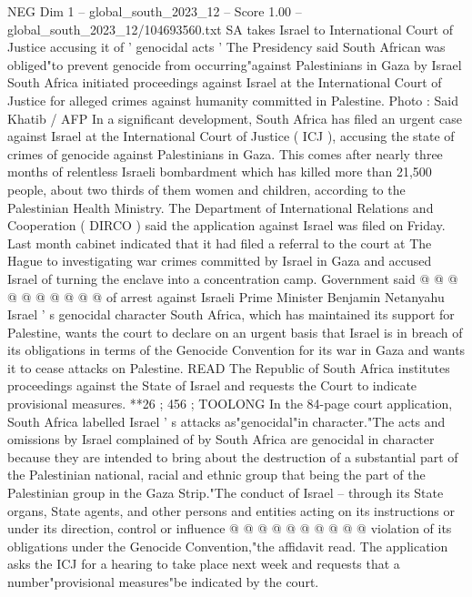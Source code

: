 \begin{textsample}{NEG Dim 1 – global\_south\_2023\_12 – Score 1.00 – global\_south\_2023\_12/104693560.txt}  \label{ex:f1_neg_289}
SA takes Israel to International Court of Justice accusing it of ' genocidal acts ' The Presidency said South African was obliged"to prevent genocide from occurring"against Palestinians in Gaza by Israel South Africa initiated proceedings against Israel at the International Court of Justice for alleged crimes against humanity committed in Palestine.
Photo : Said Khatib / AFP In a significant development, South Africa has filed an urgent case against Israel at the International Court of Justice ( ICJ ), accusing the state of crimes of genocide against Palestinians in Gaza.
This comes after nearly three months of relentless Israeli bombardment which has killed more than 21,500 people, about two thirds of them women and children, according to the Palestinian Health Ministry.
The Department of International Relations and Cooperation ( DIRCO ) said the application against Israel was filed on Friday.
Last month cabinet indicated that it had filed a referral to the court at The Hague to investigating war crimes committed by Israel in Gaza and accused Israel of turning the enclave into a concentration camp.
Government said @ @ @ @ @ @ @ @ @ @ of arrest against Israeli Prime Minister Benjamin Netanyahu Israel ' s genocidal character South Africa, which has maintained its support for Palestine, wants the court to declare on an urgent basis that Israel is in breach of its obligations in terms of the Genocide Convention for its war in Gaza and wants it to cease attacks on Palestine.
READ The Republic of South Africa institutes proceedings against the State of Israel and requests the Court to indicate provisional measures. **26 ; 456 ; TOOLONG In the 84-page court application, South Africa labelled Israel ' s attacks as"genocidal"in character."The acts and omissions by Israel complained of by South Africa are genocidal in character because they are intended to bring about the destruction of a substantial part of the Palestinian national, racial and ethnic group that being the part of the Palestinian group in the Gaza Strip."The conduct of Israel -- through its State organs, State agents, and other persons and entities acting on its instructions or under its direction, control or influence @ @ @ @ @ @ @ @ @ @ violation of its obligations under the Genocide Convention,"the affidavit read.
The application asks the ICJ for a hearing to take place next week and requests that a number"provisional measures"be indicated by the court.

\end{textsample}
